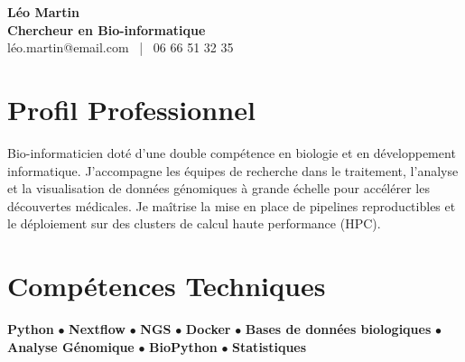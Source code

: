 \documentclass[11pt,a4paper]{article}
\begin{document}
\begin{center}
    {\Huge \textbf{Léo Martin}} \\[0.2cm]
    {\Large \textbf{Chercheur en Bio-informatique}} \\[0.1cm]
    léo.martin@email.com \ | \ 06 66 51 32 35
\end{center}

\vspace{0.3cm}

\section*{Profil Professionnel}
\noindent
Bio-informaticien doté d'une double compétence en biologie et en développement informatique. J'accompagne les équipes de recherche dans le traitement, l'analyse et la visualisation de données génomiques à grande échelle pour accélérer les découvertes médicales. Je maîtrise la mise en place de pipelines reproductibles et le déploiement sur des clusters de calcul haute performance (HPC).

\vspace{0.3cm}

\section*{Compétences Techniques}
\noindent
\textbf{Python} $\bullet$ \textbf{Nextflow} $\bullet$ \textbf{NGS} $\bullet$ \textbf{Docker} $\bullet$ \textbf{Bases de données biologiques} $\bullet$ \textbf{Analyse Génomique} $\bullet$ \textbf{BioPython} $\bullet$ \textbf{Statistiques}

\vspace{0.3cm}

\end{document}
